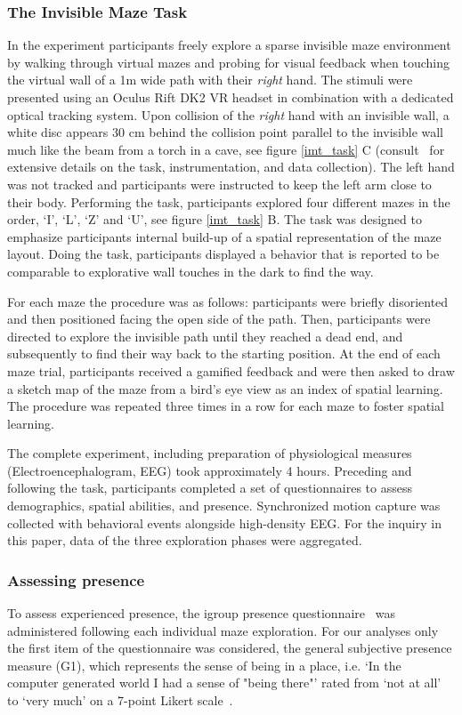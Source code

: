 \subsubsection{The Invisible Maze Task} In the experiment participants freely explore a sparse invisible maze environment by walking through virtual mazes and probing for visual feedback when touching the virtual wall of a 1m wide path with their \textit{right} hand. The stimuli were presented using an Oculus Rift DK2 VR headset in combination with a dedicated optical tracking system. Upon collision of the \textit{right} hand with an invisible wall, a white disc appears 30 cm behind the collision point parallel to the invisible wall much like the beam from a torch in a cave, see figure \ref{imt_task} C (consult~\cite{Gehrke2018} for extensive details on the task, instrumentation, and data collection). The left hand was not tracked and participants were instructed to keep the left arm close to their body. Performing the task, participants explored four different mazes in the order, `I', `L', `Z' and `U', see figure \ref{imt_task} B. The task was designed to emphasize participants internal build-up of a spatial representation of the maze layout. Doing the task, participants displayed a behavior that is reported to be comparable to explorative wall touches in the dark to find the way.

For each maze the procedure was as follows: participants were briefly disoriented and then positioned facing the open side of the path. Then, participants were directed to explore the invisible path until they reached a dead end, and subsequently to find their way back to the starting position. At the end of each maze trial, participants received a gamified feedback and were then asked to draw a sketch map of the maze from a bird’s eye view as an index of spatial learning. The procedure was repeated three times in a row for each maze to foster spatial learning. 

The complete experiment, including preparation of physiological measures (Electroencephalogram, EEG) took approximately 4 hours. Preceding and following the task, participants completed a set of questionnaires to assess demographics, spatial abilities, and presence. Synchronized motion capture was collected with behavioral events alongside high-density EEG. For the inquiry in this paper, data of the three exploration phases were aggregated.

\subsubsection{Assessing presence} To assess experienced presence, the igroup presence questionnaire~\cite{Schubert2003} was administered following each individual maze exploration. For our analyses only the first item of the questionnaire was considered, the general subjective presence measure (G1), which represents the sense of being in a place, i.e. `In the computer generated world I had a sense of "being there"' rated from `not at all' to `very much' on a 7-point Likert scale~\cite{Schubert2003, Slater1993}.

